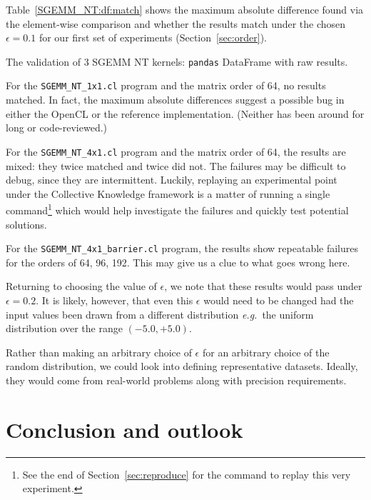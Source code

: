 \documentclass{acm_proc_article-sp} %
\begin{document}
Table~\ref{SGEMM_NT:df:match} shows the maximum absolute difference found via
the element-wise comparison and whether the results match under the chosen
$\epsilon = 0.1$ for our first set of experiments (Section~\ref{sec:order}).

\begin{sidewaystable*}
  \centering
  \caption{\label{SGEMM_NT:df:match}The validation of 3 SGEMM NT kernels: {\tt pandas} DataFrame with raw results.}
  
\end{sidewaystable*}

For the \verb|SGEMM_NT_1x1.cl| program and the matrix order of 64, no results
matched.
%
In fact, the maximum absolute differences suggest a possible bug in either the
OpenCL or the reference implementation. (Neither has been around for long or
code-reviewed.)

For the \verb|SGEMM_NT_4x1.cl| program and the matrix order of 64, the results
are mixed: they twice matched and twice did not.
%
The failures may be difficult to debug, since they are intermittent.
%
Luckily, replaying an experimental point under the Collective Knowledge
framework is a matter of running a single command\footnote{See the end of
Section~\ref{sec:reproduce} for the command to replay this very experiment.}
which would help investigate the failures and quickly test potential solutions.

For the \verb|SGEMM_NT_4x1_barrier.cl| program, the results show repeatable
failures for the orders of 64, 96, 192.
%
This may give us a clue to what goes wrong here.

Returning to choosing the value of $\epsilon$, we note that these results would pass
under $\epsilon = 0.2$.
%
It is likely, however, that even this $\epsilon$ would need to be changed had
the input values been drawn from a different distribution {\em e.g.}\ the
uniform distribution over the range $(-5.0, +5.0)$.

Rather than making an arbitrary choice of $\epsilon$ for an arbitrary choice of
the random distribution, we could look into defining representative datasets.
%
Ideally, they would come from real-world problems along with precision
requirements.
%


\section{Conclusion and outlook}
\end{document}
